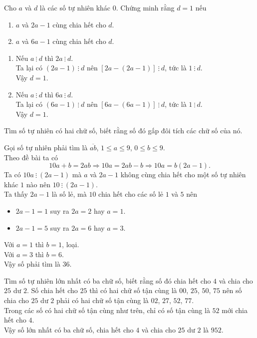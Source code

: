 \begin{vd}%
 Cho $a$ và $d$ là các số tự nhiên khác $0$. Chứng minh rằng $d=1$ nếu
 \begin{enumerate}
  \item $a$ và $2a-1$ cùng chia hết cho $d$.
  \item $a$ và $6a-1$ cùng chia hết cho $d$.
 \end{enumerate}
 \loigiai
  {
  \begin{enumerate}
   \item Nếu $a\ \vdots\ d$ thì $2a\ \vdots\ d$.\\
   Ta lại có $(2a-1)\ \vdots\ d$ nên $[2a-(2a-1)]\ \vdots\ d$, tức là $1\ \vdots\ d$.\\
   Vậy $d=1$.
   \item Nếu $a\ \vdots\ d$ thì $6a\ \vdots\ d$.\\
   Ta lại có $(6a-1)\ \vdots\ d$ nên $[6a-(6a-1)]\ \vdots\ d$, tức là $1\ \vdots\ d$.\\
   Vậy $d=1$.
  \end{enumerate}
  }
\end{vd}

\begin{vd}%
 Tìm số tự nhiên có hai chữ số, biết rằng số đó gấp đôi tích các chữ số của nó.
 \loigiai
  {
  Gọi số tự nhiên phải tìm là $\overline{ab}$, $1 \leq a \leq 9$, $0 \leq b \leq 9$.\\
  Theo đề bài ta có
  $$10a+b=2ab \Rightarrow 10a=2ab-b \Rightarrow 10a=b(2a-1).$$
  Ta có $10a\ \vdots\ (2a-1)$ mà $a$ và $2a-1$ không cùng chia hết cho một số tự nhiên khác $1$ nào nên $10\ \vdots\ (2a-1)$.\\
  Ta thấy $2a-1$ là số lẻ, mà $10$ chia hết cho các số lẻ $1$ và $5$ nên
  \begin{itemize}
  	\item $2a-1=1$ suy ra $2a=2$ hay $a=1$.
  	\item $2a-1=5$ suy ra $2a=6$ hay $a=3$.
  \end{itemize}
  Với $a=1$ thì $b=1$, loại.\\
  Với $a=3$ thì $b=6$.\\
  Vậy số phải tìm là $36$.
  }
\end{vd}

\begin{vd}%
 Tìm số tự nhiên lớn nhất có ba chữ số, biết rằng số đó chia hết cho $4$ và chia cho $25$ dư $2$.
 \loigiai
  {
  Số chia hết cho $25$ thì có hai chữ số tận cùng là $00$, $25$, $50$, $75$ nên số chia cho $25$ dư $2$ phải có hai chữ số tận cùng là $02$, $27$, $52$, $77$.\\
  Trong các số có hai chữ số tận cùng như trên, chỉ có số tận cùng là $52$ mới chia hết cho $4$.\\
  Vậy số lớn nhất có ba chữ số, chia hết cho $4$ và chia cho $25$ dư $2$ là $952$.
  }
\end{vd}

